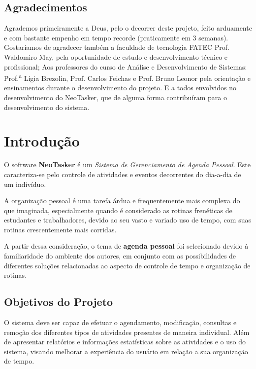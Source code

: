 \documentclass[a4paper,12pt]{article}
\begin{document}
\pagebreak
\begin{center}
\section*{Agradecimentos}
\end{center}
Agrademos primeiramente a Deus, pelo o decorrer deste projeto, feito arduamente e com bastante empenho em tempo recorde (praticamente em 3 semanas). Gostaríamos de 
agradecer também a faculdade de tecnologia FATEC Prof. Waldomiro May, pela oportunidade de estudo e desenvolvimento técnico e profissional; Aos professores do curso de
Análise e Desenvolvimento de Sistemas: Prof.\textsuperscript{a} Lígia Brezolin, Prof. Carlos Feichas e Prof. Bruno Leonor pela orientação e ensinamentos durante o desenvolvimento do projeto.
E a todos envolvidos no desenvolvimento do NeoTasker, que de alguma forma contribuíram para o desenvolvimento do sistema.
\pagebreak

\listoffigures
\pagebreak


\setcounter{tocdepth}{4}
\tableofcontents
\pagebreak

\pagebreak
\section{Introdução}
O software \textbf{NeoTasker} é um \textit{Sistema de Gerenciamento de Agenda Pessoal}. Este caracteriza-se pelo controle de atividades 
e eventos decorrentes do dia-a-dia de um indivíduo.

A organização pessoal é uma tarefa árdua e frequentemente mais complexa do que imaginada, especialmente quando é considerado as rotinas 
frenéticas de estudantes e trabalhadores, devido ao seu vasto e variado uso de tempo, com suas rotinas crescentemente mais corridas.

A partir dessa consideração, o tema de \textbf{agenda pessoal} foi selecionado devido à familiaridade do ambiente dos autores, em 
conjunto com as possibilidades de diferentes soluções relacionadas ao aspecto de controle de tempo e organização de rotinas.

\subsection{Objetivos do Projeto}
O sistema deve ser capaz de efetuar o agendamento, modificação, consultas e remoção dos diferentes tipos de atividades presentes 
de maneira individual. Além de apresentar relatórios e informações estatísticas sobre as atividades e o uso do sistema, visando 
melhorar a experiência do usuário em relação a sua organização de tempo.
\end{document}
